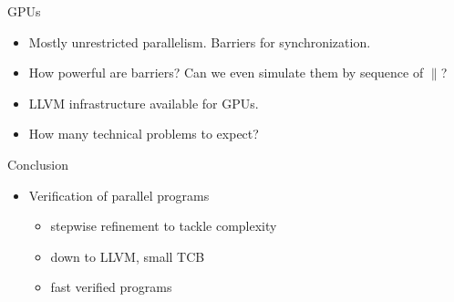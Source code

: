 \documentclass[fleqn]{beamer}
\newcommand{\high}[1]{{\color{blue}#1}}
\begin{document}
\begin{frame}{GPUs}
  \begin{itemize}
   \item Mostly unrestricted parallelism. Barriers for synchronization.
   \item How powerful are barriers? Can we even simulate them by sequence of $\parallel$?
   \item LLVM infrastructure available for GPUs.
   \item How many technical problems to expect?

  \end{itemize}
\end{frame}
{


\begin{frame}{Conclusion}
  \begin{itemize}
   \item Verification of parallel programs
    \begin{itemize}
     \item stepwise refinement to tackle complexity
     \item down to LLVM, small TCB
     \item \high{fast} verified programs


\end{itemize}
\end{itemize}
\end{frame}}
\end{document}
